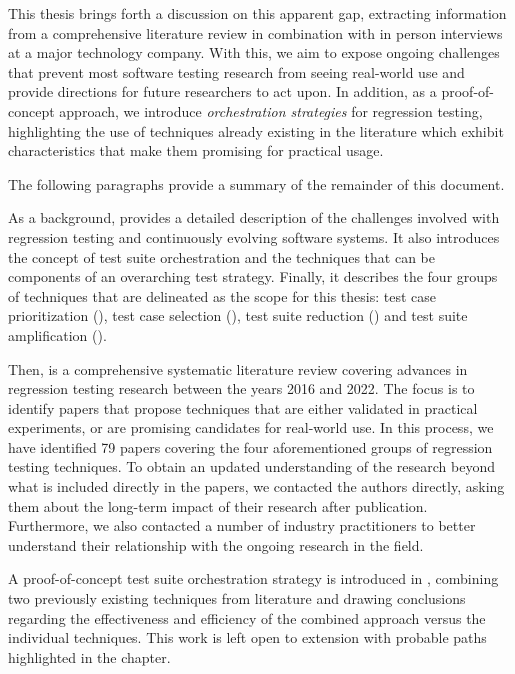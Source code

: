 This thesis brings forth a discussion on this apparent gap, extracting information from a comprehensive literature review in combination with in person interviews at a major technology company.
With this, we aim to expose ongoing challenges that prevent most software testing research from seeing real-world use and provide directions for future researchers to act upon.
In addition, as a proof-of-concept approach, we introduce \textit{orchestration strategies} for regression testing, highlighting the use of techniques already existing in the literature which exhibit characteristics that make them promising for practical usage.

The following paragraphs provide a summary of the remainder of this document.

As a background,  provides a detailed description of the challenges involved with regression testing and continuously evolving software systems.
It also introduces the concept of test suite orchestration and the techniques that can be components of an overarching test strategy.
Finally, it describes the four groups of techniques that are delineated as the scope for this thesis: test case prioritization (\tcp), test case selection (\tcs), test suite reduction (\tsr) and test suite amplification (\tsa).

Then,  is a comprehensive systematic literature review covering advances in regression testing research between the years 2016 and 2022.
The focus is to identify papers that propose techniques that are either validated in practical experiments, or are promising candidates for real-world use.
In this process, we have identified 79 papers covering the four aforementioned groups of regression testing techniques.
To obtain an updated understanding of the research beyond what is included directly in the papers, we contacted the authors directly, asking them about the long-term impact of their research after publication.
Furthermore, we also contacted a number of industry practitioners to better understand their relationship with the ongoing research in the field.

A proof-of-concept test suite orchestration strategy is introduced in , combining two previously existing techniques from literature and drawing conclusions regarding the effectiveness and efficiency of the combined approach versus the individual techniques.
This work is left open to extension with probable paths highlighted in the chapter.

